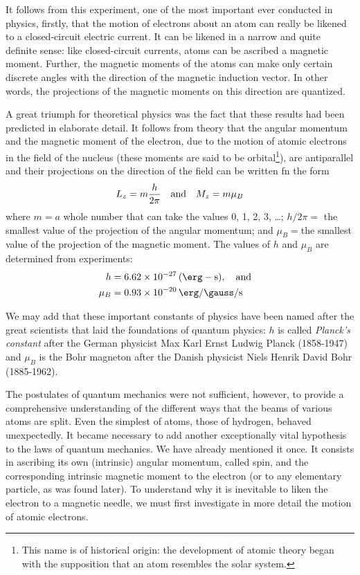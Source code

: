It follows from this experiment, one of the most important ever conducted in physics, firstly, that the motion of electrons about an atom can really be likened to a closed-circuit electric current. It can be likened in a narrow and quite definite sense: like closed-circuit currents, atoms can be ascribed a magnetic moment. Further, the magnetic moments of the atoms can make only certain discrete angles with the direction of the magnetic induction vector. In other words, the projections of the magnetic moments on this direction are quantized.

A great triumph for theoretical physics was the fact that these results had been predicted in elaborate detail. It follows from theory that the angular momentum and the magnetic moment of the electron, due to the motion of atomic electrons in the field of the nucleus (these moments are said to be orbital\footnote{This name is of historical origin: the development of atomic theory began with the supposition that an atom resembles the solar system.}), are antiparallel and their projections on the direction of the field can be written fn the form
\begin{equation*}%
L_{z} = m \frac{h}{2\pi} \qqtext{and} M_{z} = m \mu_{B}
\end{equation*}
where $m=a$ whole number that can take the values 0, 1, 2, 3, \ldots{}; $h/2\pi=$ the smallest value of the projection of the angular momentum; and $\mu_{B}=$the smallest value of the projection of the magnetic moment. The values of $h$ and $\mu_{B}$ are determined from experiments:
\begin{align*}%
h & = \SI{6.62d-27}{(\erg-\second)}, \qand \\
\mu_{B} & = \SI{0.93d-20}{\erg\per\gauss\per\second}
\end{align*}

We may add that these important constants of physics have been named after the great scientists that laid the foundations of quantum physics: $h$ is called \emph{Planck's constant} after the German physicist Max Karl Ernst Ludwig Planck (1858-1947) and $\mu_{B}$ is the Bohr magneton after the Danish physicist Niels Henrik David Bohr (1885-1962).\label{ang-mom}

The postulates of quantum mechanics were not sufficient, however, to provide a comprehensive understanding of the different ways that the beams of various atoms are split. Even the simplest of atoms, those of hydrogen, behaved unexpectedly. It became necessary to add another exceptionally vital hypothesis to the laws of quantum mechanics. We have already mentioned it once. It consists in ascribing its own (intrinsic) angular momentum, called spin, and the corresponding intrinsic magnetic moment to the electron (or to any elementary particle, as was found later). To understand why it is inevitable to liken the electron to a magnetic needle, we must first investigate in more detail the motion of atomic electrons.

